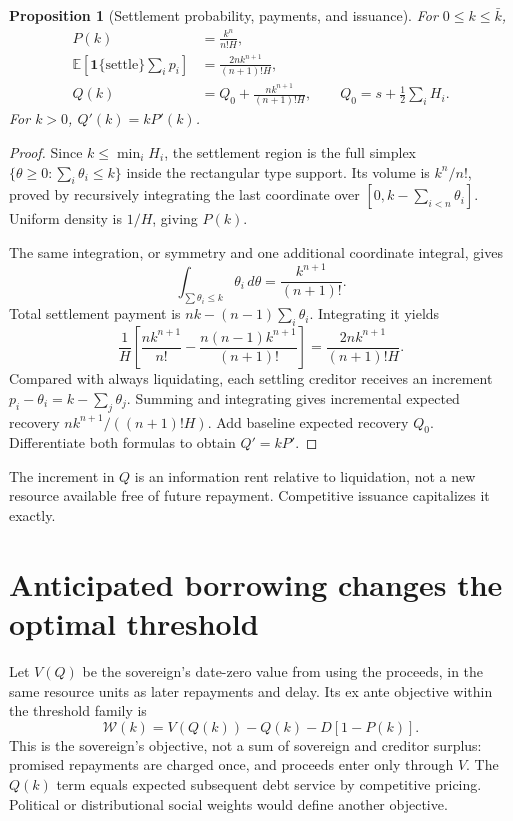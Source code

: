 \documentclass[11pt,a4paper]{article}
\newtheorem{proposition}[theorem]{Proposition}
\theoremstyle{remark}
\newcommand{\E}{\mathbb E}
\newcommand{\ind}{\mathbf 1}
\begin{document}
\begin{proposition}[Settlement probability, payments, and issuance]
For $0\le k\le\bar k$,
\begin{align*}
 P(k)&=\frac{k^n}{n!H},\\
 \E\left[\ind\{\text{settle}\}\sum_i p_i\right]
 &=\frac{2n k^{n+1}}{(n+1)!H},\\
 Q(k)&=Q_0+\frac{n k^{n+1}}{(n+1)!H},
 \qquad Q_0=s+\frac12\sum_iH_i.
\end{align*}
For $k>0$, $Q'(k)=kP'(k)$.
\end{proposition}
\begin{proof}
Since $k\le\min_iH_i$, the settlement region is the full simplex $\{\theta\ge0:\sum_i\theta_i\le k\}$ inside the rectangular type support. Its volume is $k^n/n!$, proved by recursively integrating the last coordinate over $[0,k-\sum_{i<n}\theta_i]$. Uniform density is $1/H$, giving $P(k)$.

The same integration, or symmetry and one additional coordinate integral, gives
\[
 \int_{\sum\theta_i\le k}\theta_i\,d\theta
 =\frac{k^{n+1}}{(n+1)!}.
\]
Total settlement payment is $nk-(n-1)\sum_i\theta_i$. Integrating it yields
\[
 \frac1H\left[\frac{nk^{n+1}}{n!}
 -\frac{n(n-1)k^{n+1}}{(n+1)!}\right]
 =\frac{2nk^{n+1}}{(n+1)!H}.
\]
Compared with always liquidating, each settling creditor receives an increment $p_i-\theta_i=k-\sum_j\theta_j$. Summing and integrating gives incremental expected recovery $nk^{n+1}/((n+1)!H)$. Add baseline expected recovery $Q_0$. Differentiate both formulas to obtain $Q'=kP'$.
\end{proof}

The increment in $Q$ is an information rent relative to liquidation, not a new resource available free of future repayment. Competitive issuance capitalizes it exactly.

\section{Anticipated borrowing changes the optimal threshold}
Let $V(Q)$ be the sovereign's date-zero value from using the proceeds, in the same resource units as later repayments and delay. Its ex ante objective within the threshold family is
\[
 \mathcal W(k)=V(Q(k))-Q(k)-D[1-P(k)]. \tag{1}
\]
This is the sovereign's objective, not a sum of sovereign and creditor surplus: promised repayments are charged once, and proceeds enter only through $V$. The $Q(k)$ term equals expected subsequent debt service by competitive pricing. Political or distributional social weights would define another objective.
\end{document}
